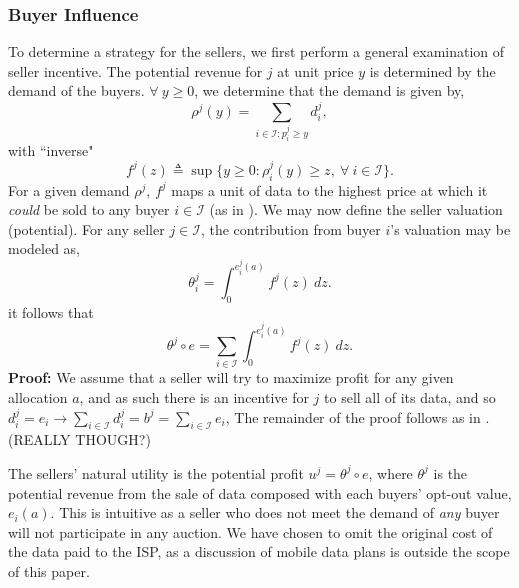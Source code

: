\documentclass[12pt]{article}
\theoremstyle{definition}
\newcommand{\mcI}{\mathcal{I}}
\begin{document}
\begin{multicols}{2}
\subsubsection{Buyer Influence}
To determine a strategy for the sellers, we first perform a general examination
of seller incentive. The potential revenue for $j$ at unit price $y$ is determined by the
demand of the buyers. $\forall \ y\ge 0$, we determine that the demand is given by,
\begin{equation}\label{datademand}
    \rho^j(y) = \sum_{i\in\mcI : p_i^j\ge y} d_i^j, 
\end{equation}
with ``inverse"
\begin{equation}\label{revenue}
    f^j(z) \triangleq \sup\big\lbrace y\ge 0:
        \rho_i^j(y) \ge z, \ \forall \ i \in \mcI\big\rbrace.
\end{equation}
For a given demand $\rho^j$, $f^j$ maps a unit of data to the highest price at
which it \emph{could} be sold to any buyer $i\in \mcI$ (as in \cite{semret}).
We may now define the seller valuation (potential). 
{
\label{sellervaluation}
For any seller $j\in\mcI$, the contribution from buyer $i$'s valuation may be
modeled as,
\begin{equation}\label{singlevaluation}
    \theta_i^j = \int_0^{e_i^j(a)} f^j(z) \ dz.
\end{equation}
it follows that 
\begin{equation}\label{valuation}
    \theta^j \circ e = \displaystyle\sum_{i\in\mcI}
 \int_0^{e_i^j(a)} f^j(z) \ dz.
\end{equation}
}
\textbf{Proof:} 
We assume that a seller will try to maximize profit for any given allocation $a$, and
as such there is an incentive for $j$ to sell all of its data, and so 
$d_i^j = e_i \rightarrow \sum_{i\in{\mcI}} d_i^j = b^j =
\sum_{i\in\mcI} e_i$,
The remainder of the proof follows as in \cite{semret}. (REALLY THOUGH?)

The sellers' natural utility is the potential
profit $u^j = \theta^j\circ e$, where $\theta^j$ is the
potential revenue from the sale of data composed with each buyers' opt-out value, $e_i(a)$. 
This is intuitive as a seller who does not meet the demand of \emph{any} buyer will not
participate in any auction. We have chosen to omit the original cost of the data
paid to the ISP, as a discussion of mobile data plans is outside the scope of this
paper.  


\end{multicols}
\end{document}
